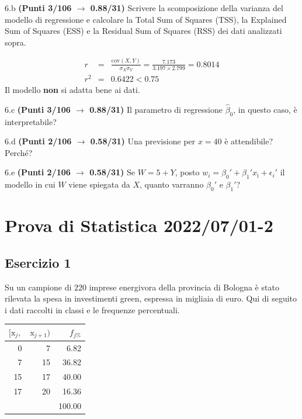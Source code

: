 \documentclass[
  11pt,
]{book}
\theoremstyle{mytheoremstyle}
\theoremstyle{mydefstyle}
\newenvironment{sol}
  {
  \begin{tcolorbox}[enhanced,breakable,arc=0.1mm,boxrule=1pt,colback=white,colframe=iblue,
  title=\bf \fontfamily{lmss}\selectfont \hspace{.5 cm} Soluzione,drop fuzzy shadow]

}{
\end{tcolorbox}
  }
\begin{document}
6.b \textbf{(Punti 3/106 \(\rightarrow\) 0.88/31)} Scrivere la scomposizione della varianza del modello di regressione
e calcolare la Total Sum of Squares (TSS), la Explained Sum of Squares (ESS) e la Residual Sum of Squares (RSS) dei dati analizzati sopra.

\begin{sol}
\begin{eqnarray*}
r&=&\frac{\text{cov}(X,Y)}{\sigma_X\sigma_Y}=\frac{ 7.173 }{ 3.197 \times 2.799 }= 0.8014 \\r^2&=& 0.6422 < 0.75
\end{eqnarray*}
Il modello \textbf{non} si adatta bene ai dati.

\end{sol}

6.c \textbf{(Punti 3/106 \(\rightarrow\) 0.88/31)} Il parametro di regressione \(\hat\beta_0\), in questo caso, è interpretabile?

6.d \textbf{(Punti 2/106 \(\rightarrow\) 0.58/31)} Una previsione per \(x=40\) è attendibile? Perché?

6.e \textbf{(Punti 2/106 \(\rightarrow\) 0.58/31)} Se \(W=5+ Y\), posto \(w_i=\beta_0'+\beta_1'x_ì +\epsilon_i'\)
il modello in cui \(W\) viene spiegata da \(X\), quanto varranno \(\beta_0'\) e \(\beta_1'\)?

\section{Prova di Statistica 2022/07/01-2}\label{prova-di-statistica-20220701-2}

\subsection{Esercizio 1}\label{esercizio-1-15}

Su un campione di \(220\) imprese energivora della provincia di Bologna è stato
rilevata la spesa in investimenti green, espressa in migliaia di euro. Qui di seguito i dati raccolti in classi
e le frequenze percentuali.

\begin{table}[H]
\centering
\begin{tabular}{rrr}
\toprule
$[\text{x}_j,$ & $\text{x}_{j+1})$ & $f_{j\%}$\\
\midrule
0 & 7 & 6.82\\
7 & 15 & 36.82\\
15 & 17 & 40.00\\
17 & 20 & 16.36\\
 &  & 100.00\\
\bottomrule
\end{tabular}
\end{table}
\end{document}

